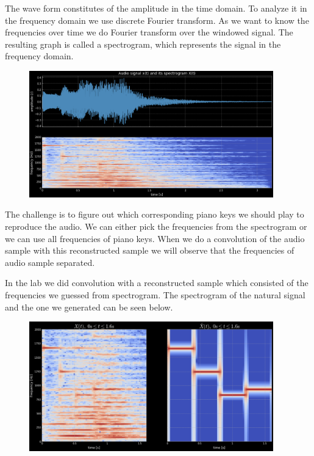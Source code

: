 The wave form constitutes of the amplitude  in the time domain. To analyze it in the frequency domain we use discrete Fourier transform. As we want to know the frequencies over time we do Fourier transform over the windowed signal. The resulting graph is called a spectrogram, which represents the signal in the frequency domain.

\begin{figure}[ht]
    \centering
    \includegraphics[width=300pt]{figs/2.png}
    \label{fig:spectrogram}
\end{figure}

The challenge is to figure out which corresponding piano keys we should play to reproduce the audio. We can either pick the frequencies from the spectrogram or we can use all frequencies of piano keys. When we do a convolution of the audio sample with this reconstructed sample we will observe that the frequencies of audio sample separated. 

In the lab we did convolution with a reconstructed sample which consisted of the frequencies we guessed from spectrogram. The spectrogram of the natural signal and the one we generated can be seen below.
\begin{figure}[ht]
    \centering
    \includegraphics[width=300pt]{figs/3.png}
    \label{fig:spectrograms of original and reconstruction}
\end{figure}
